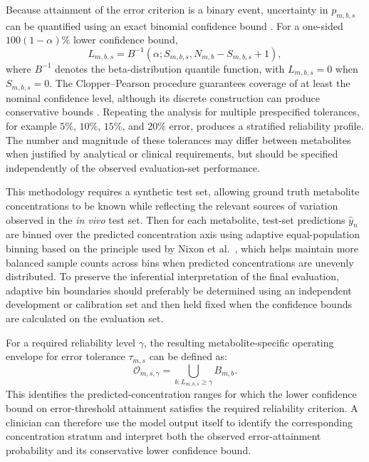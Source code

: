 Because attainment of the error criterion is a binary event, uncertainty in $p_{m,b,s}$ can be quantified using an exact binomial confidence bound \cite{Clopper1934}. For a one-sided $100(1-\alpha)\%$ lower confidence bound,
\begin{equation}
    L_{m,b,s} = B^{-1} \left( \alpha; S_{m,b,s}, N_{m,b} - S_{m,b,s} + 1 \right),
\end{equation}%
where $B^{-1}$ denotes the beta-distribution quantile function, with $L_{m,b,s}=0$ when $S_{m,b,s}=0$. The Clopper--Pearson procedure guarantees coverage of at least the nominal confidence level, although its discrete construction can produce conservative bounds \cite{Clopper1934, Brown2001}. Repeating the analysis for multiple prespecified tolerances, for example $5\%$, $10\%$, $15\%$, and $20\%$ error, produces a stratified reliability profile. The number and magnitude of these tolerances may differ between metabolites when justified by analytical or clinical requirements, but should be specified independently of the observed evaluation-set performance.

This methodology requires a synthetic test set, allowing ground truth metabolite concentrations to be known while reflecting the relevant sources of variation observed in the \textit{in vivo} test set. Then for each metabolite, test-set predictions $\hat{y}_n$ are binned over the predicted concentration axis using adaptive equal-population binning based on the principle used by Nixon et al.~\cite{Nixon2019}, which helps maintain more balanced sample counts across bins when predicted concentrations are unevenly distributed. To preserve the inferential interpretation of the final evaluation, adaptive bin boundaries should preferably be determined using an independent development or calibration set and then held fixed when the confidence bounds are calculated on the evaluation set.

For a required reliability level $\gamma$, the resulting metabolite-specific operating envelope for error tolerance $\tau_{m,s}$ can be defined as:
\begin{equation}
    \mathcal O_{m,s,\gamma} = \bigcup_{b:L_{m,b,s} \geq \gamma} B_{m,b}.
\end{equation}
This identifies the predicted-concentration ranges for which the lower confidence bound on error-threshold attainment satisfies the required reliability criterion. A clinician can therefore use the model output itself to identify the corresponding concentration stratum and interpret both the observed error-attainment probability and its conservative lower confidence bound.

